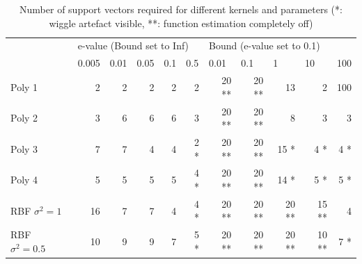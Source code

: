 \documentclass[11pt, a4paper]{article}
\begin{document}
\begin{table}[H]
  \centering
  \begin{tabular}{l|r|r|r|r|r|r|r|r|r|r|}
    \cline{2-11}
    & \multicolumn{5}{l|}{e-value (Bound set to Inf)}                                                                                                 & \multicolumn{5}{l|}{Bound (e-value set to 0.1)}                                                                                           \\ \cline{2-11} 
    & \multicolumn{1}{l|}{0.005} & \multicolumn{1}{l|}{0.01} & \multicolumn{1}{l|}{0.05} & \multicolumn{1}{l|}{0.1} & \multicolumn{1}{l|}{0.5} & \multicolumn{1}{l|}{0.01} & \multicolumn{1}{l|}{0.1} & \multicolumn{1}{l|}{1} & \multicolumn{1}{l|}{10} & \multicolumn{1}{l|}{100} \\ \hline
    \multicolumn{1}{|l|}{Poly 1}             & 2                          & 2                         & 2                         & 2                        & 2                        & 20 **                     & 20 **                    & 13                     & 2                       & 100                      \\ \hline
    \multicolumn{1}{|l|}{Poly 2}             & 3                          & 6                         & 6                         & 6                        & 3                        & 20 **                     & 20 **                    & 8                      & 3                       & 3                        \\ \hline
    \multicolumn{1}{|l|}{Poly 3}             & 7                          & 7                         & 4                         & 4                        & 2 *                      & 20 **                     & 20 **                    & 15 *                   & 4 *                     & 4 *                      \\ \hline
    \multicolumn{1}{|l|}{Poly 4}             & 5                          & 5                         & 5                         & 5                        & 4 *                      & 20 **                     & 20 **                    & 14 *                   & 5 *                     & 5 *                      \\ \hline
    \multicolumn{1}{|l|}{RBF $\sigma^2=1$}   & 16                         & 7                         & 7                         & 4                        & 4 *                      & 20 **                     & 20 **                    & 20 **                  & 15 **                   & 4                        \\ \hline
    \multicolumn{1}{|l|}{RBF $\sigma^2=0.5$} & 10                         & 9                         & 9                         & 7                        & 5 *                      & 20 **                     & 20 **                    & 20 **                  & 10 **                   & 7 *                      \\ \hline
  \end{tabular}
  \caption{Number of support vectors required for different kernels and parameters (*: wiggle artefact visible, **: function estimation completely off)}
  \label{table:dataset_lin}
\end{table}
\end{document}
